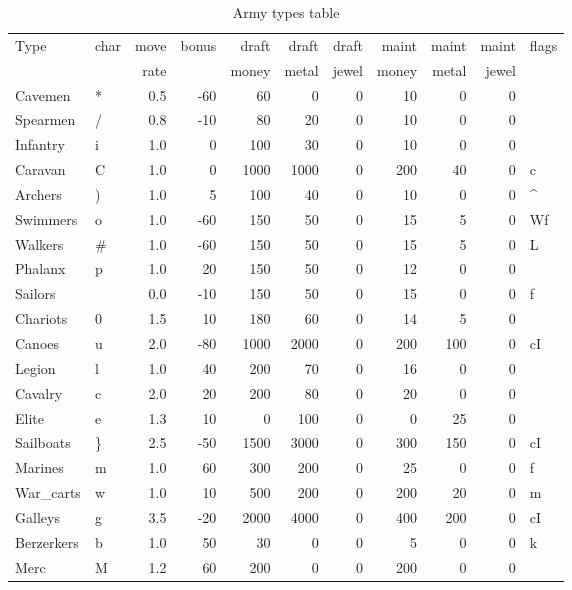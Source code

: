 \begin{same}
\begin{table}[hbpt]
\caption{Army types table}
\begin{tabular}{ || l | l | r | r | r | r | r | r | r | r | l || }
\hline
Type      &char&move&bonus&draft&draft&draft&maint&maint&maint&flags \\
          &    &rate&     &money&metal&jewel&money&metal&jewel&      \\
\hline
Cavemen      &*& 0.5& -60 &  60 &   0 &   0 &  10 &   0 &   0 &\\
Spearmen     &/& 0.8& -10 &  80 &  20 &   0 &  10 &   0 &   0 &\\
Infantry     &i& 1.0&   0 & 100 &  30 &   0 &  10 &   0 &   0 &\\
Caravan      &C& 1.0&   0 &1000 &1000 &   0 & 200 &  40 &   0 &c\\
Archers      &)& 1.0&   5 & 100 &  40 &   0 &  10 &   0 &   0 &^\\
Swimmers     &o& 1.0& -60 & 150 &  50 &   0 &  15 &   5 &   0 &Wf\\
Walkers      &#& 1.0& -60 & 150 &  50 &   0 &  15 &   5 &   0 &L\\
Phalanx      &p& 1.0&  20 & 150 &  50 &   0 &  12 &   0 &   0 &\\
Sailors      &~& 0.0& -10 & 150 &  50 &   0 &  15 &   0 &   0 &f\\
Chariots     &0& 1.5&  10 & 180 &  60 &   0 &  14 &   5 &   0 &\\
Canoes       &u& 2.0& -80 &1000 &2000 &   0 & 200 & 100 &   0 &cI\\
Legion       &l& 1.0&  40 & 200 &  70 &   0 &  16 &   0 &   0 &\\
Cavalry      &c& 2.0&  20 & 200 &  80 &   0 &  20 &   0 &   0 &\\
Elite        &e& 1.3&  10 &   0 & 100 &   0 &   0 &  25 &   0 &\\
Sailboats    &\}& 2.5& -50 &1500 &3000 &   0 & 300 & 150 &   0 &cI\\
Marines      &m& 1.0&  60 & 300 & 200 &   0 &  25 &   0 &   0 &f\\
War_carts    &w& 1.0&  10 & 500 & 200 &   0 & 200 &  20 &   0 &m\\
Galleys      &g& 3.5& -20 &2000 &4000 &   0 & 400 & 200 &   0 &cI\\
Berzerkers   &b& 1.0&  50 &  30 &   0 &   0 &   5 &   0 &   0 &k\\
Merc         &M& 1.2&  60 & 200 &   0 &   0 & 200 &   0 &   0 &\\

\end{tabular}
\end{table}
\end{same}
